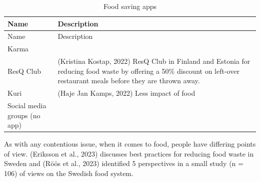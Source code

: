 \documentclass[
  12pt,
  letterpaper,
  DIV=11,
  numbers=noendperiod]{scrartcl}
\begin{document}
\def\pandoctableshortcapt{Food Saving Apps}

\begin{longtable}[]{@{}
  >{\raggedright\arraybackslash}p{}
  >{\raggedright\arraybackslash}p{}@{}}
\caption[Food Saving Apps]{Food saving apps}\tabularnewline
\toprule\noalign{}
\begin{minipage}[b]{\linewidth}\raggedright
Name
\end{minipage} & \begin{minipage}[b]{\linewidth}\raggedright
Description
\end{minipage} \\
\midrule\noalign{}
\endfirsthead
\toprule\noalign{}
\begin{minipage}[b]{\linewidth}\raggedright
Name
\end{minipage} & \begin{minipage}[b]{\linewidth}\raggedright
Description
\end{minipage} \\
\midrule\noalign{}
\endhead
\bottomrule\noalign{}
\endlastfoot
Karma & \\
ResQ Club & (Kristina Kostap, 2022) ResQ Club in Finland and Estonia for
reducing food waste by offering a 50\% discount on left-over restaurant
meals before they are thrown away. \\
Kuri & (Haje Jan Kamps, 2022) Less impact of food \\
Social media groups (no app) & \\
\end{longtable}

\let\pandoctableshortcapt\relax

As with any contentious issue, when it comes to food, people have
differing points of view. (Eriksson et al., 2023) discusses best
practices for reducing food waste in Sweden and (Röös et al., 2023)
identified 5 perspectives in a small study (n = 106) of views on the
Swedish food system.

\def\pandoctableshortcapt{Perspectives on the Food Systems in Sweden}
\end{document}
